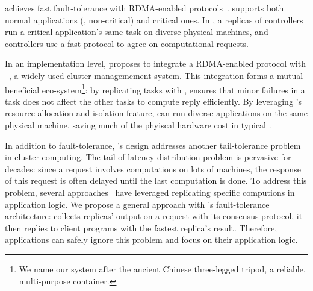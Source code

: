 \xxx achieves fast fault-tolerance with RDMA-enabled 
\paxos protocols~\cite{dare:hpdc15,falcon:github}. \xxx supports both normal 
applications (\ie, non-critical) and critical ones. In \xxx, a replicas of 
controllers run a critical application's same task on diverse physical 
machines, and controllers use a fast \paxos protocol to agree on computational 
requests. 

In an implementation level, \xxx proposes to integrate a RDMA-enabled \paxos 
protocol with \mesos~\cite{mesos}, a widely used cluster managemement system. 
This integration forms a mutual beneficial eco-system\footnote{We name our 
system after the ancient Chinese three-legged tripod, a reliable, multi-purpose 
container.}: by replicating tasks with \paxos, \xxx ensures that minor failures 
in a task does not affect the other tasks to compute reply efficiently. By 
leveraging \mesos's resource allocation and isolation feature, \xxx can run 
diverse applications on the same physical machine, saving much of the phyiscal 
hardware cost in typical \paxos.



In addition to fault-tolerance, \xxx's design addresses another tail-tolerance 
problem~\cite{tail:scale} in cluster computing. The tail of latency 
distribution problem is pervasive for decades: since a request 
involves computations on lots of machines, the response of this request is 
often delayed until the last computation is done. To address this problem, 
several approaches~\cite{mapreduce,spark,tail:scale} have leveraged replicating 
specific computions in application logic. We propose a general approach with 
\xxx's fault-tolerance architecture: \xxx collects replicas' output on a 
request with its consensus protocol, it then replies to client programs with 
the fastest replica's result. Therefore, applications can safely ignore this 
problem and focus on their application logic.

